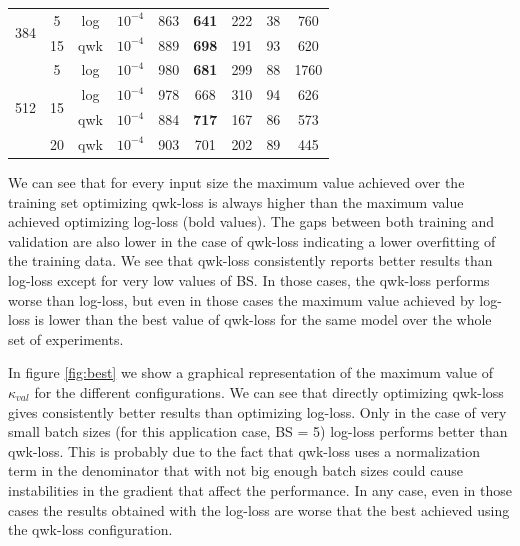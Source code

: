 \documentclass[times,twocolumn,final,authoryear]{elsarticle}
\begin{document}
\begin{table}[h!]
{\begin{tabular}{c|c|c|c|c|c|c|c|c}
		\hline					
		\multirow{2}{*}{384} & \multirow{1}{*}{5} & \multirow{1}{*}{log} & $10^{-4}$ & 863 & \textbf{641} & 222 & 38 & 760\\\cline{2-9}
		& \multirow{1}{*}{15} & \multirow{1}{*}{qwk} & $10^{-4}$ & 889 & \textbf{698} & 191 & 93 & 620 \\\cline{2-9}
		\hline					
		\multirow{4}{*}{512} & \multirow{1}{*}{5} & \multirow{1}{*}{log} & $10^{-4}$ & 980 & \textbf{681} & 299 & 88 & 1760\\\cline{2-9}
		& \multirow{2}{*}{15} & \multirow{1}{*}{log} & $10^{-4}$ & 978 & 668 & 310 &  94 & 626\\\cline{3-9}
		&  & \multirow{1}{*}{qwk} & $10^{-4}$ & 884 & \textbf{717} & 167 & 86 & 573 \\\cline{2-9}
		& \multirow{1}{*}{20} & \multirow{1}{*}{qwk} & $10^{-4}$ & 903 & 701 & 202 & 89 & 445\\\cline{3-9}			
		\hline
	\end{tabular}
}
\end{table}

We can see that for every input size the maximum value achieved over the training set optimizing qwk-loss is always higher than the maximum value achieved optimizing log-loss (bold values). The gaps between both training and validation are also lower in the case of qwk-loss indicating a lower overfitting of the training data. We see that qwk-loss consistently reports better results than log-loss except for very low values of BS. In those cases, the qwk-loss performs worse than log-loss, but even in those cases the maximum value achieved by log-loss is lower than the best value of qwk-loss for the same model over the whole set of experiments.

In figure \ref{fig:best} we show a graphical representation of the maximum value of $\kappa_{val}$ for the different configurations. We can see that directly optimizing qwk-loss gives consistently better results than optimizing log-loss. Only in the case of very small batch sizes (for this application case, BS = 5) log-loss performs better than qwk-loss. This is probably due to the fact that qwk-loss uses a normalization term in the denominator that with not big enough batch sizes could cause instabilities in the gradient that affect the performance. In any case, even in those cases the results obtained with the log-loss are worse that the best achieved using the qwk-loss configuration.
\end{document}
